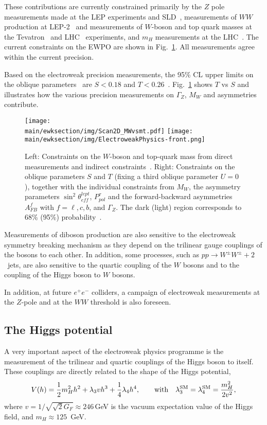 \documentclass[../report.tex]{subfiles}
\providecommand{\main}{..}
\newcommand{\ew}{electroweak\xspace}
\begin{document}
These contributions are currently constrained primarily by the $Z$ pole measurements made at the LEP experiments and SLD~\cite{ALEPH:2010aa}, measurements of $WW$ production at LEP-2~\cite{LEP-2} and measurements of $W$-boson and top quark masses at the Tevatron~\cite{tevmw,tevmtop} and LHC~\cite{Aaboud:2017svj,Tokar:2019wny} experiments, and $m_H$ measurements at the LHC~\cite{Aaboud:2018wps, Sirunyan:2017exp}. The current constraints on the EWPO are shown in Fig.~\ref{fig:ewknow}. All measurements agree within the current precision.

Based on the \ew precision measurements, the 95\% CL upper limits on the oblique parameters~\cite{Peskin:1990zt} are $S<0.18$ and $T<0.26$~\cite{Tanabashi:2018oca}. Fig.~\ref{fig:ewknow} shows $T$ vs $S$ and illustrates how the various precision measurements on $\Gamma_Z$, $M_W$ and asymmetries contribute. 
 
\begin{figure}[h]
    \centering
    \texttt{[image: \\main/ewksection/img/Scan2D\_MWvsmt.pdf]}
    \texttt{[image: \\main/ewksection/img/ElectroweakPhysics-front.png]}
\caption{
Left: Constraints on the $W$-boson and top-quark mass from direct measurements and indirect constraints~\cite{Baak:2014ora}. 
Right: Constraints on the oblique parameters $S$ and $T$ (fixing a third oblique parameter $U = 0$), 
together with the individual constraints from $M_W$, the
asymmetry parameters $\sin^2\theta^{lept}_{eff}$, $P_{pol}^{\tau}$
and the forward-backward asymmetries $A_{FB}^{f}$ with $f = \ell, c, b$, and $\Gamma_Z$. The dark (light) region corresponds to 68\% (95\%) probability~\cite{deBlas:2016ojx}.
    \label{fig:ewknow}}
\end{figure}

Measurements of diboson production are also sensitive to the \ew symmetry breaking mechanism as they depend on the trilinear gauge couplings of the bosons to each other. In addition, some processes, such as  $pp\to W^\pm W^\pm +2$~jets,  are  also sensitive to the quartic coupling of the $W$ bosons and to the coupling of the Higgs boson to $W$ bosons. 

In addition, at future $e^+e^-$ colliders, a campaign of \ew  measurements at the $Z$-pole and at the $WW$ threshold is also foreseen.

\subsection{The Higgs potential}
A very important aspect of the \ew physics programme is the measurement of the trilinear and quartic couplings of the Higgs boson to itself. These couplings are directly related to the shape of the Higgs potential, 
\begin{equation}\label{eq:SMpotential}
V(h)= \frac{1}{2} m_H^2 h^2 + \lambda_3 v h^3 + \frac{1}{4}\lambda_4 h^4,\qquad \textrm{with}\quad \lambda_3^{\rm SM}= \lambda_4^{\rm SM}= \frac{m_H^2}{2 v^2},
\end{equation}
where $v=1/\sqrt{\sqrt{2}G_F}\approx 246$\,GeV is the vacuum expectation value of the Higgs field, and $m_H\approx 125$~GeV.
\end{document}
